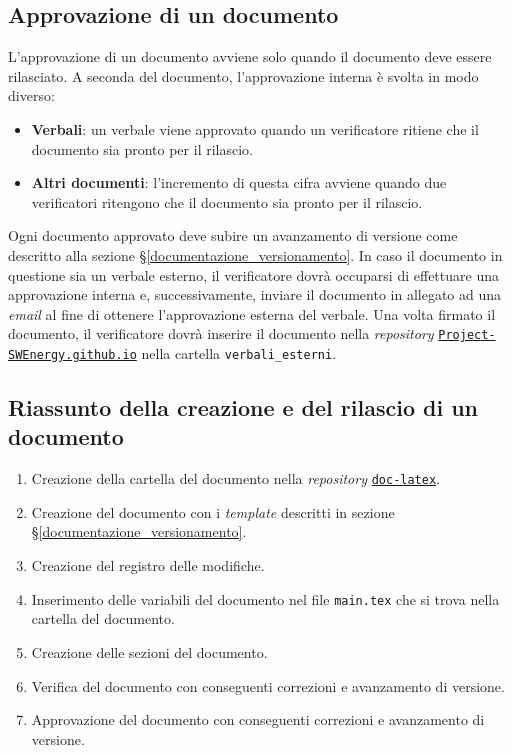 \subsection{Approvazione di un documento}
L'approvazione di un documento avviene solo quando il documento deve essere
rilasciato. A seconda del documento, l'approvazione interna è svolta in modo
diverso:
\begin{itemize}
	\item \textbf{Verbali}: un verbale viene approvato quando un verificatore
	      ritiene che il documento sia pronto per il rilascio.

	\item \textbf{Altri documenti}: l'incremento di questa cifra avviene
	      quando due verificatori ritengono che il documento sia pronto per il
	      rilascio.
\end{itemize}

Ogni documento approvato deve subire un avanzamento di versione come descritto
alla sezione \S\ref{documentazione_versionamento}.
\noindent
In caso il documento in questione sia un verbale esterno, il verificatore dovrà
occuparsi di effettuare una approvazione interna e, successivamente, inviare il
documento in allegato ad una \textit{email} al fine di ottenere l'approvazione
esterna del verbale. Una volta firmato il documento, il verificatore dovrà
inserire il documento nella \textit{repository}
\href{https://github.com/Project-SWEnergy/Project-SWEnergy.github.io}{\texttt{Project-SWEnergy.github.io}}
nella cartella \texttt{verbali\_esterni}.

\subsection{Riassunto della creazione e del rilascio di un documento}

\begin{enumerate}
	\item Creazione della cartella del documento nella \textit{repository}
	      \href{https://github.com/Project-SWEnergy/doc-latex}{\texttt{doc-latex}}.
	\item Creazione del documento con i \textit{template} descritti in
	      sezione \S\ref{documentazione_versionamento}.
	\item Creazione del registro delle modifiche.
	\item Inserimento delle variabili del documento nel file
	      \texttt{main.tex} che si trova nella cartella del documento.
	\item Creazione delle sezioni del documento.
	\item Verifica del documento con conseguenti correzioni e avanzamento di
	      versione.
	\item Approvazione del documento con conseguenti correzioni e avanzamento
	      di versione.
\end{enumerate}

